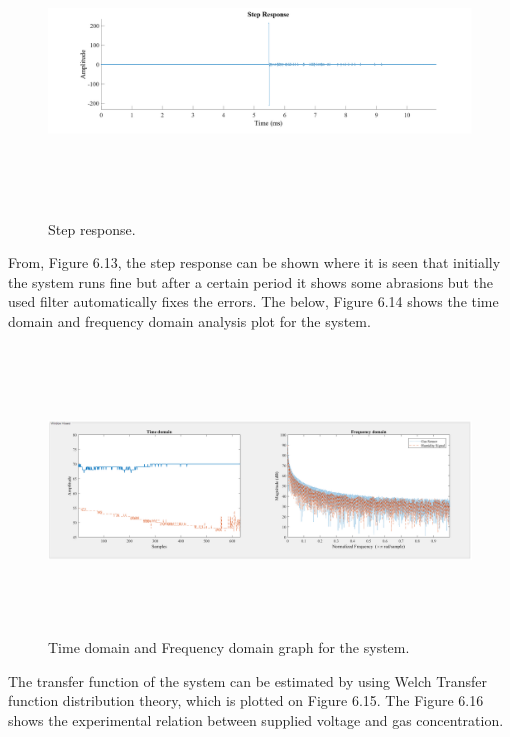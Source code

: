 \begin{figure}[H]
	\begin{Center}
		\includegraphics[width=6.5in,height=3in]{27}
	\end{Center}
\caption{Step response.}
\end{figure}
From, Figure 6.13, the step response can be shown where it is seen that initially the system runs fine but after a certain period it shows some abrasions but the used filter automatically fixes the errors. The below, Figure 6.14 shows the time domain and frequency domain analysis plot for the system.
\begin{figure}[H]
	\begin{Center}
		\includegraphics[width=6.5in,height=3in]{28}
		\caption{Time domain and Frequency domain graph for the system.}
		\label{fig:_14_Time_domain_and_Frequency_domain_graph_for_the_system}
	\end{Center}
\end{figure}
The transfer function of the system can be estimated by using Welch Transfer function distribution theory, which is plotted on Figure 6.15. The Figure 6.16 shows the experimental relation between supplied voltage and gas concentration.
